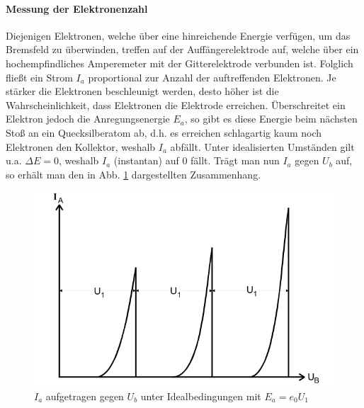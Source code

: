 \paragraph{Messung der Elektronenzahl}
Diejenigen Elektronen, welche über eine hinreichende Energie verfügen, um das Bremsfeld zu überwinden, treffen auf der Auffängerelektrode auf, welche über ein hochempfindliches Amperemeter mit der Gitterelektrode verbunden ist. Folglich fließt ein Strom $I_a$ proportional zur Anzahl der auftreffenden Elektronen. Je stärker die Elektronen beschleunigt werden, desto höher ist die Wahrscheinlichkeit, dass Elektronen die Elektrode erreichen. Überschreitet ein Elektron jedoch die Anregungsenergie $E_a$, so gibt es diese Energie beim nächsten Stoß an ein Quecksilberatom ab, d.h. es erreichen schlagartig kaum noch Elektronen den Kollektor, weshalb $I_a$ abfällt. Unter idealisierten Umständen gilt u.a. $\Delta E = 0$, weshalb $I_a$ (instantan) auf 0 fällt. Trägt man nun $I_a$ gegen $U_b$ auf, so erhält man den in Abb. \ref{fig:ideal} dargestellten Zusammenhang.

\begin{figure}
  \center
  \includegraphics[width = \textwidth]{./logos/ideal.PNG}
  \caption{$I_a$ aufgetragen gegen $U_b$ unter Idealbedingungen mit $E_a = e_0 U_1$ \cite{Anleitung}}
  \label{fig:ideal}
\end{figure}
